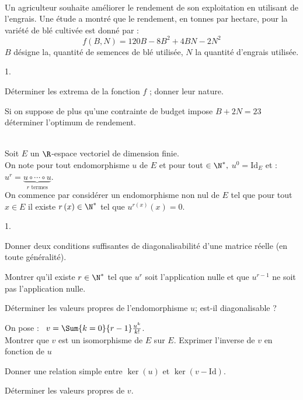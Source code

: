 \documentclass[11pt]{article}%
\begin{document}
\begin{exerciceSP}~\\
  Un agriculteur souhaite améliorer le rendement de son exploitation
  en utilisant de l'engrais. Une étude a montré que le rendement, en
  tonnes par hectare, pour la variété de blé cultivée est donné par :
  \[
  f\left( B,N\right) =120B-8B^{2}+4BN-2N^{2}
  \]
  $B$ désigne la, quantité de semences de blé utilisée, $N$ la
  quantité d'engrais utilisée.
  \begin{noliste}{1.}
    \setlength{\itemsep}{2mm}
  \item Déterminer les extrema de la fonction $f$ ; donner leur
    nature.
  \item Si on suppose de plus qu'une contrainte de budget impose
    $B+2N=23$ déterminer l'optimum de rendement.
  \end{noliste}
\end{exerciceSP}




\begin{exerciceAP}~\\
  Soit $E$ un $\R$-espace vectoriel de dimension finie.\\
  On note pour tout endomorphisme $u$ de $E$ et pour tout $\in
  \N^{\ast },$ $u^{0}= \mathrm{Id}_{E}$ et : \
  $u^{r} = \underset{r\text{ termes}}{\underbrace{u\circ \cdots \circ
      u}}$.\\[.2cm]
  On commence par considérer un endomorphisme non nul de $E$ tel que
  pour tout $x\in E$ il existe $r\left( x\right) \in \N^{\ast }$ tel
  que $u^{r\left( x\right) }(x) = 0$.
  \begin{noliste}{1.}
    \setlength{\itemsep}{2mm}
  \item Donner deux conditions suffisantes de diagonalisabilité d'une
    matrice réelle (en toute généralité).

  \item Montrer qu'il existe $r\in \N^{\ast }$ tel que $u^{r}$ soit
    l'application nulle et que $u^{r-1}$ ne soit pas l'application
    nulle.

  \item Déterminer les valeurs propres de l'endomorphisme $u$; est-il
    diagonalisable ?

  \item On pose : \ $v=\Sum{k=0}{r-1}\frac{u^{k}}{k!}$.\\
    Montrer que $v$ est un isomorphisme de $E$ sur $E$. Exprimer
    l'inverse de $v$ en fonction de $u$

  \item Donner une relation simple entre $\ker \left( u\right) $ et
    $\ker \left( v-\mathrm{Id}\right)$.

  \item Déterminer les valeurs propres de $v$.
  \end{noliste}
\end{exerciceAP}
\end{document}
